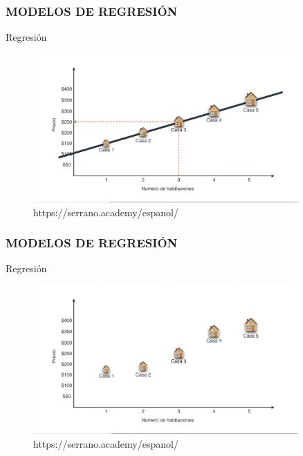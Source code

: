 \documentclass{beamer}
\begin{document}
\begin{frame}
	\frametitle{MODELOS DE REGRESIÓN}
\begin{block}{Regresión}	
		\begin{figure}
			\includegraphics[width=0.9\textwidth]{imagenes_regresion/IMG_3486.jpg}
			\caption{https://serrano.academy/espanol/}
		\end{figure}
	\end{block}
\end{frame}

\begin{frame}
	\frametitle{MODELOS DE REGRESIÓN}
\begin{block}{Regresión}	
		\begin{figure}
			\includegraphics[width=0.9\textwidth]{imagenes_regresion/IMG_3487.jpg}
			\caption{https://serrano.academy/espanol/}
		\end{figure}
	\end{block}
\end{frame}
\end{document}
